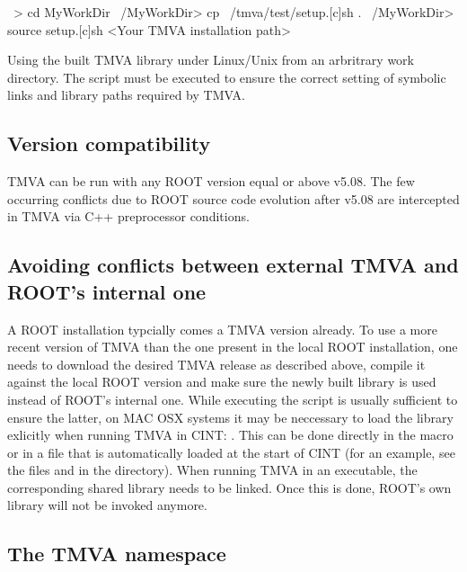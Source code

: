 \begin{codeexample}
\begin{tmvacode}
~> cd MyWorkDir
~/MyWorkDir> cp ~/tmva/test/setup.[c]sh . 
~/MyWorkDir> source setup.[c]sh <Your TMVA installation path>
\end{tmvacode}
\caption[.]{\codeexampleCaptionSize Using the built TMVA library under Linux/Unix from an arbritrary work directory. The  script must be executed to 
         ensure the correct setting of symbolic links and library paths required by TMVA.}
\end{codeexample}

\subsection{Version compatibility}
\label{sec:intro:compat}

TMVA can be run with any ROOT version equal or above v5.08.
The few occurring conflicts due to ROOT source code evolution after v5.08 are 
intercepted in TMVA via C++ preprocessor conditions.

\subsection{Avoiding conflicts between external TMVA and ROOT's internal one}

A ROOT installation typcially comes a TMVA version already.
To use a more recent version of TMVA than the one present in the local ROOT 
installation, one needs to download the desired TMVA release as described above,
compile it against the local ROOT version and make sure the newly built library 
 is used instead of ROOT's internal one.
While executing the  script is usually sufficient to ensure the latter,
on MAC OSX systems it may be neccessary to load the library exlicitly when running TMVA in CINT:  
. This can be done 
directly in the macro or in a file that is automatically loaded at the start 
of CINT (for an example, see the files  and  
in the  directory).  When running TMVA in an executable, 
the corresponding shared library needs to be linked.
Once this is done, ROOT's own  library will not be invoked anymore.

\subsection{The TMVA namespace}
\label{sec:quickstart:namespace}

